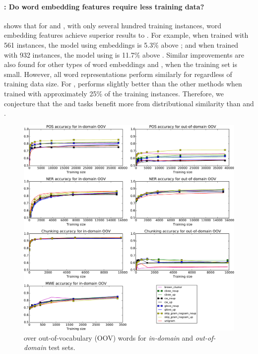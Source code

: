 \paragraph{\RQ[2]: Do word embedding features require less training data?}
 shows that for \pos and \ner, with only several hundred training instances, 
word embedding features achieve superior results to \unigram. 
For example, when trained with 561 instances, the \pos model using \Skipgram[\withup] embeddings is 5.3\% above
\unigram; and when trained with 932 instances, the \ner model using \Skipgram is 11.7\% above \unigram. 
Similar improvements are also found for other types of word embeddings and \brown, when the training set is small. 
However, all word representations perform similarly for \chunking
regardless of training data size.
For \mwe, \brown performs slightly better than the other methods when
trained with approximately 25\% of the training instances. 
Therefore, we conjecture that the \pos and \ner tasks benefit more from
distributional similarity than \chunking and \mwe.

\begin{figure}[t!]
\centering
    	\includegraphics[scale=0.5]{plots/OOV-plots}
\caption{\accuracy over out-of-vocabulary (OOV) words for \textit{in-domain} and \textit{out-of-domain} test sets.}
\label{OOV} 
\end{figure}

